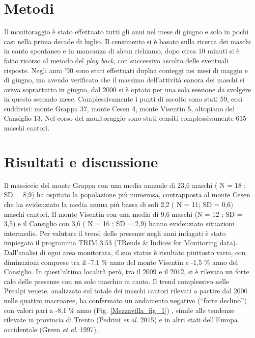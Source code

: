 \section*{Metodi}

Il monitoraggio \`e stato effettuato tutti gli anni nel mese di giugno e
solo in pochi casi  nella prima decade di luglio. Il censimento si \`e
basato sulla ricerca dei maschi in canto spontaneo e in mancanza di
alcun richiamo, dopo circa 10 minuti si \`e fatto ricorso al metodo del
\textit{play back}, con successivo ascolto delle eventuali risposte.
Negli anni {\textquoteright}90 sono stati effettuati duplici conteggi
nei mesi di maggio e di giugno, ma avendo verificato che il massimo
dell{\textquoteright}attivit\`a canora dei maschi si aveva soprattutto
in giugno, dal 2000 si \`e optato per una sola sessione da svolgere in
questo secondo mese. Complessivamente i punti di ascolto sono stati 59,
cos\`i suddivisi: monte Grappa 37, monte Cesen 4, monte Visentin 5,
altopiano del Cansiglio 13. Nel corso del monitoraggio sono stati
censiti complessivamente 615 maschi cantori. 

\section*{Risultati e discussione}

Il massiccio del monte Grappa con una media annuale di 23,6 maschi ( N =
18 ; SD = 8,9) ha ospitato la popolazione pi\`u numerosa, contrapposta 
al monte Cesen che ha evidenziato la media annua pi\`u bassa di soli
2,2 ( N = 11; SD = 0,6) maschi cantori. Il monte Visentin con una media
di 9,6 maschi (N = 12 ; SD = 3,5) e il Cansiglio con 3,6 ( N = 16 ;  SD
= 2,9) hanno evidenziato situazioni intermedie.  Per valutare il trend
delle presenze negli anni indagati \`e stato  impiegato il programma
TRIM  3.53 (TRends \& Indices for Monitoring data).
Dall{\textquoteright}analisi di ogni area monitorata,  il suo status 
\`e risultato  piuttosto vario, con diminuzioni comprese tra il -7,1 \%
anno del monte Visentin e -1,5 \% anno del Cansiglio. In
quest{\textquoteright}ultima localit\`a per\`o, tra il 2009 e il 2012,
si \`e rilevato un forte calo delle presenze con un solo maschio in
canto. Il trend complessivo nelle Prealpi venete, analizzato sul totale
dei maschi cantori rilevati a partire dal 2000 nelle quattro macroaree,
ha confermato un  andamento negativo ({\textquotedblleft}forte
declino{\textquotedblright}) con valori  pari a -8,1 \%  anno (Fig. \ref{Mezzavilla_fig_1})
, simile alle tendenze rilevate in provincia di Trento (Pedrini
\textit{et al}. 2015) e in altri stati dell{\textquoteright}Europa
occidentale (Green \textit{et al}. 1997).

